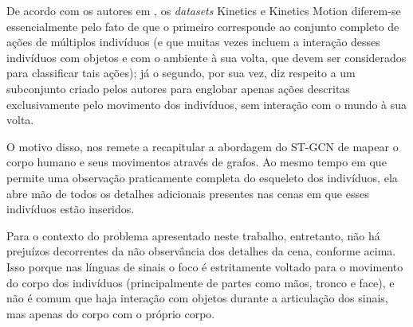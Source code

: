 De acordo com os autores em \cite{st-gcn-2018}, os \textit{datasets} Kinetics e Kinetics Motion diferem-se essencialmente pelo fato de que o primeiro corresponde ao conjunto completo de ações de múltiplos indivíduos (e que muitas vezes incluem a interação desses indivíduos com objetos e com o ambiente à sua volta, que devem ser considerados para classificar tais ações); já o segundo, por sua vez, diz respeito a um subconjunto criado pelos autores para englobar apenas ações descritas exclusivamente pelo movimento dos indivíduos, sem interação com o mundo à sua volta. 

O motivo disso, nos remete a recapitular a abordagem do ST-GCN de mapear o corpo humano e seus movimentos através de grafos. Ao mesmo tempo em que permite uma observação praticamente completa do esqueleto dos indivíduos, ela abre mão de todos os detalhes adicionais presentes nas cenas em que esses indivíduos estão inseridos. 

Para o contexto do problema apresentado neste trabalho, entretanto, não há prejuízos decorrentes da não observância dos detalhes da cena, conforme acima. Isso porque nas línguas de sinais o foco é estritamente voltado para o movimento do corpo dos indivíduos (principalmente de partes como mãos, tronco e face), e não é comum que haja interação com objetos durante a articulação dos sinais, mas apenas do corpo com o próprio corpo.











